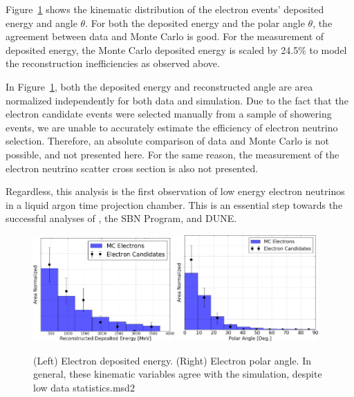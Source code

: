 Figure~\ref{fig:electron_kinematics} shows the kinematic distribution of the electron events' deposited energy and angle $\theta$.  For both the deposited energy and the polar angle $\theta$, the agreement between data and Monte Carlo is good.  For the measurement of deposited energy, the Monte Carlo deposited energy is scaled by 24.5\% to model the reconstruction inefficiencies as observed above.

In Figure~\ref{fig:electron_kinematics}, both the deposited energy and reconstructed angle are area normalized independently for both data and simulation.  Due to the fact that the electron candidate events were selected manually from a sample of showering events, we are unable to accurately estimate the efficiency of electron neutrino selection.  Therefore, an absolute comparison of data and Monte Carlo is not possible, and not presented here.  For the same reason, the measurement of the electron neutrino scatter cross section is also not presented.

Regardless, this analysis is the first observation of low energy electron neutrinos in a liquid argon time projection chamber.  This is an essential step towards the successful analyses of \uboone, the SBN Program, and DUNE.


\begin{figure}[htbp]
  \centering
  \includegraphics[width=0.48\textwidth]{emshower_figures/depE_corrected_trimmed.png}
  \includegraphics[width=0.48\textwidth]{emshower_figures/angle_comparison_trimmed.png}
  \caption[Electron Kinematic Variables]{(Left) Electron deposited energy. (Right) Electron polar angle.  In general, these kinematic variables agree with the simulation, despite low data statistics.msd2}
  \label{fig:electron_kinematics}
\end{figure}

